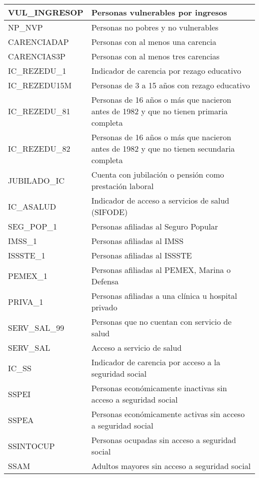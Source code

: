\begin{longtable}{|p{8cm}|p{8cm}|}
    \hline
    VUL\_INGRESOP & Personas vulnerables por ingresos \\
    \hline
    NP\_NVP & Personas no pobres y no vulnerables \\
    \hline
    CARENCIADAP & Personas con al menos una carencia \\
    \hline
    CARENCIAS3P & Personas con al menos tres carencias \\
    \hline
    IC\_REZEDU\_1 & Indicador de carencia por rezago educativo \\
    \hline
    IC\_REZEDU15M & Personas de 3 a 15 años con rezago educativo \\
    \hline
    IC\_REZEDU\_81 & Personas de 16 años o más que nacieron antes de 1982 y que no tienen primaria completa \\
    \hline
    IC\_REZEDU\_82 & Personas de 16 años o más que nacieron antes de 1982 y que no tienen secundaria completa \\
    \hline
    JUBILADO\_IC & Cuenta con jubilación o pensión como prestación laboral \\
    \hline
    IC\_ASALUD & Indicador de acceso a servicios de salud (SIFODE)\\
    \hline
    SEG\_POP\_1 & Personas afiliadas al Seguro Popular \\
    \hline
    IMSS\_1 & Personas afiliadas al IMSS \\
    \hline
    ISSSTE\_1 & Personas afiliadas al ISSSTE \\
    \hline
    PEMEX\_1 & Personas afiliadas al PEMEX, Marina o Defensa \\
    \hline
    PRIVA\_1 & Personas afiliadas a una clínica u hospital privado \\
    \hline
    SERV\_SAL\_99 & Personas que no cuentan con servicio de salud \\
    \hline
    SERV\_SAL & Acceso a servicio de salud \\
    \hline
    IC\_SS & Indicador de carencia por acceso a la seguridad social \\
    \hline
    SSPEI & Personas económicamente inactivas sin acceso a seguridad social \\
    \hline
    SSPEA & Personas económicamente activas sin acceso a seguridad social \\
    \hline
    SSINTOCUP & Personas ocupadas sin acceso a seguridad social \\
    \hline
    SSAM & Adultos mayores sin acceso a seguridad social\\

\end{longtable}
